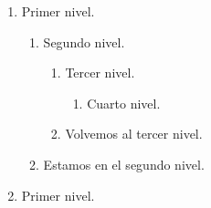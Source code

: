 \documentclass[a4paper,12pt]{article}
\begin{document}
\renewcommand{\theenumi}{\Roman{enumi}}
 \renewcommand{\labelenumi}{[\textbf{\theenumi}]}
 \renewcommand{\theenumii}{\Alph{enumii}}
 \renewcommand{\labelenumii}{[\textbf{\theenumi}.\textit{\theenumii}]}
   \begin{enumerate}
    \item Primer nivel.
        \begin{enumerate}
            \item Segundo nivel.
                \begin{enumerate}
                    \item Tercer nivel.
                        \begin{enumerate}
                            \item Cuarto nivel.
                        \end{enumerate}
                    \item Volvemos al tercer nivel.
                \end{enumerate}
            \item Estamos en el segundo nivel.
        \end{enumerate}
    \item Primer nivel.
 \end{enumerate}
 
\end{document}
